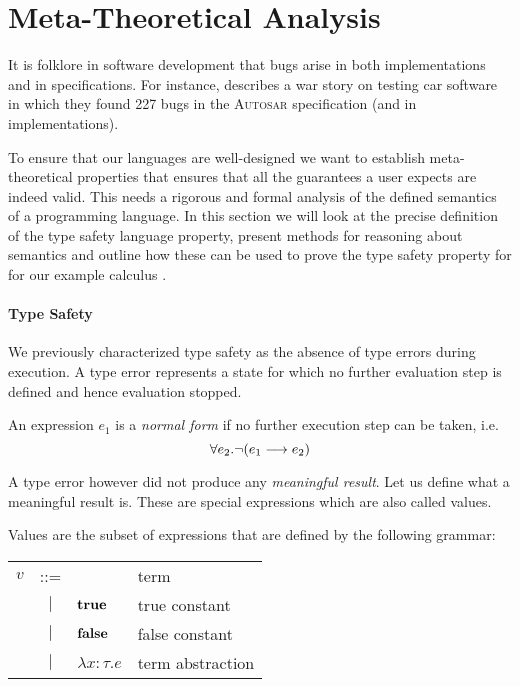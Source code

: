 {%
\section{Meta-Theoretical Analysis}\label{sec:intro:typesafety}

It is folklore in software development that bugs arise in both implementations
and in specifications. For instance, \cite{arts2015testing} describes a war
story on testing car software in which they found 227 bugs in the
\textsc{Autosar} specification (and in implementations).

To ensure that our languages are well-designed we want to establish
meta-theoretical properties that ensures that all the guarantees a user expects
are indeed valid. This needs a rigorous and formal analysis of the defined
semantics of a programming language. In this section we will look at the precise
definition of the type safety language property, present methods for reasoning
about semantics and outline how these can be used to prove the type safety
property for for our example calculus \stlcbool.

\paragraph{Type Safety}
We previously characterized type safety as the absence of type errors during
execution. A type error represents a state for which no further evaluation step
is defined and hence evaluation stopped.

\begin{defn}
  An expression $e_1$ is a \emph{normal form} if no further execution step can be
  taken, i.e.
  \[ \forall e_2. \neg ({e_1} \longrightarrow {e_2}) \]
\end{defn}

A type error however did not produce any \emph{meaningful result}. Let us define
what a meaningful result is. These are special expressions which are also called
values.

\begin{defn}[Value]
  Values are the subset of expressions that are defined by the following
  grammar:
  \begin{center}
    \begin{tabular}{lcll}
      $v$ & ::=    &                    & term             \\
          & $\mid$ & $\textbf{true}$            & true constant    \\
          & $\mid$ & $\textbf{false}$           & false constant   \\
          & $\mid$ & $\lambda x:\tau.e$ & term abstraction \\
    \end{tabular}
  \end{center}
\end{defn}

}
